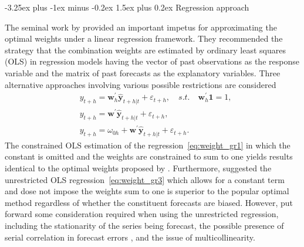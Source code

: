 \documentclass[11pt]{article}
\makeatletter
\renewcommand{\paragraph}{\@startsection{paragraph}{4}{0ex}%
   {-3.25ex plus -1ex minus -0.2ex}%
   {1.5ex plus 0.2ex}%
   {\normalfont\normalsize\bfseries}}
\makeatother
\begin{document}

\paragraph{Regression approach}

The seminal work by \cite{Granger1984-jc} provided an important impetus for approximating the optimal weights under a linear regression framework. They recommended the strategy that the combination weights are estimated by ordinary least squares (OLS) in regression models having the vector of past observations as the response variable and the matrix of past forecasts as the explanatory variables. Three alternative approaches involving various possible restrictions are considered
\begin{align}
&y_{t+h}=\boldsymbol{w}_{h}^{\prime} \hat{\mathbf{y}}_{t+h|t}+\varepsilon_{t+h}, \quad s.t. \quad \boldsymbol{w}_{h}^{\prime}\mathbf{1}=1, \label{eq:weight_gr1}\\
&y_{t+h}=\boldsymbol{w}^{\prime} \hat{\mathbf{y}}_{t+h|t}+\varepsilon_{t+h}, \label{eq:weight_gr2}\\
&y_{t+h}=\omega_{0h}+\boldsymbol{w}^{\prime} \hat{\mathbf{y}}_{t+h|t}+\varepsilon_{t+h}. \label{eq:weight_gr3}
\end{align}
The constrained OLS estimation of the regression~\eqref{eq:weight_gr1} in which the constant is omitted and the weights are constrained to sum to one yields results identical to the optimal weights proposed by \cite{Bates1969-yj}. Furthermore, \cite{Granger1984-jc} suggested the unrestricted OLS regression~\eqref{eq:weight_gr3} which allows for a constant term and dose not impose the weights sum to one is superior to the popular optimal method regardless of whether the constituent forecasts are biased. However, \cite{De_Menezes2000-vd} put forward some consideration required when using the unrestricted regression, including the stationarity of the series being forecast, the possible presence of serial correlation in forecast errors \citep[see also][]{Diebold1988-sx,Edward_Coulson1993-db}, and the issue of multicollinearity.
\end{document}
